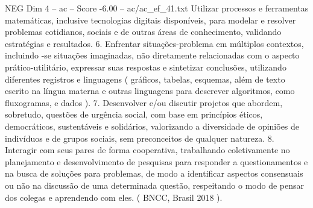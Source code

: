 \begin{textsample}{NEG Dim 4 – ac – Score -6.00 – ac/ac\_ef\_41.txt}
Utilizar processos e ferramentas matemáticas, inclusive tecnologias digitais disponíveis, para modelar e resolver problemas cotidianos, sociais e de outras áreas de conhecimento, validando estratégias e resultados. 6.
Enfrentar situações-problema em múltiplos contextos, incluindo -se situações imaginadas, não diretamente relacionadas com o aspecto prático-utilitário, expressar suas respostas e sintetizar conclusões, utilizando diferentes registros e linguagens ( gráficos, tabelas, esquemas, além de texto escrito na língua materna e outras linguagens para descrever algoritmos, como fluxogramas, e dados ). 7.
Desenvolver e/ou discutir projetos que abordem, sobretudo, questões de urgência social, com base em princípios éticos, democráticos, sustentáveis e solidários, valorizando a diversidade de opiniões de indivíduos e de grupos sociais, sem preconceitos de qualquer natureza. 8.
Interagir com seus pares de forma cooperativa, trabalhando coletivamente no planejamento e desenvolvimento de pesquisas para responder a questionamentos e na busca de soluções para problemas, de modo a identificar aspectos consensuais ou não na discussão de uma determinada questão, respeitando o modo de pensar dos colegas e aprendendo com eles. ( BNCC, Brasil 2018 ).

\end{textsample}
